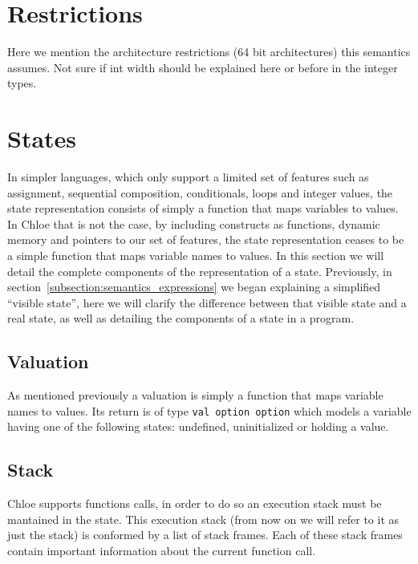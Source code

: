 \section{Restrictions}\label{subsection:restrictions_commands}
Here we mention the architecture restrictions (64 bit architectures) this semantics assumes.
Not sure if int width should be explained here or before in the integer types.


\section{States}\label{section:states}

In simpler languages, which only support a limited set of features such as assignment, sequential composition, conditionals, loops and integer values, the state representation consists of simply a function that maps variables to values.
In Chloe that is not the case, by including constructs as functions, dynamic memory and pointers to our set of features, the state representation ceases to be a simple function that maps variable names to values.
In this section we will detail the complete components of the representation of a state.
Previously, in section~\ref{subsection:semantics_expressions} we began explaining a simplified ``visible state'', here we will clarify the difference between that visible state and a real state, as well as detailing the components of a state in a program.

\subsection{Valuation}\label{subsection:valuation}

As mentioned previously a valuation is simply a function that maps variable names to values.
Its return is of type \verb|val option option| which models a variable having one of the following states: undefined, uninitialized or holding a value.


\subsection{Stack}\label{subsection:stack}

Chloe supports functions calls, in order to do so an execution stack must be mantained in the state.
This execution stack (from now on we will refer to it as just the stack) is conformed by a list of stack frames.
Each of these stack frames contain important information about the current function call.

